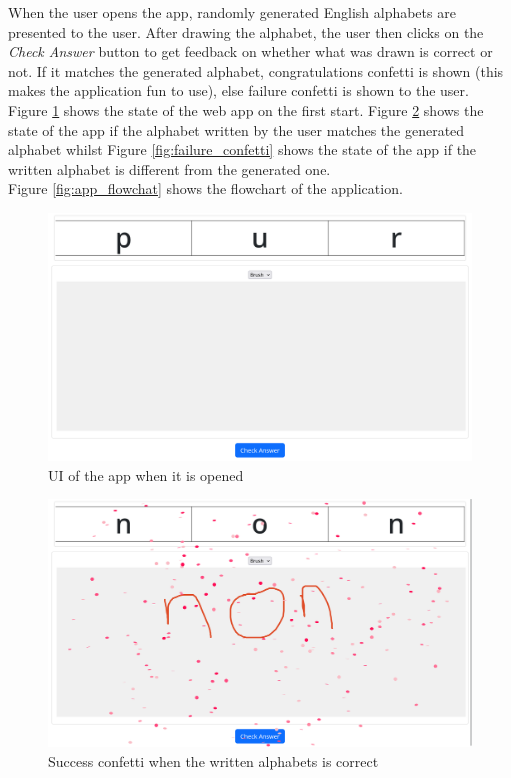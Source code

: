 \documentclass[twocolumn,oneside,12pt,a4paper]{article}
\begin{document}
When the user opens the app, randomly generated English alphabets are presented to the user. After drawing the alphabet, the user then clicks on the \textit{Check Answer} button to get feedback on whether what was drawn is correct or not. If it matches the generated alphabet, congratulations confetti is shown (this makes the application fun to use), else failure confetti is shown to the user. Figure \ref{fig:start_state} shows the state of the web app on the first start. Figure \ref{fig:success_confetti} shows the state of the app if the alphabet written by the user matches the generated alphabet whilst Figure \ref{fig:failure_confetti} shows the state of the app if the written alphabet is different from the generated one. \\
Figure \ref{fig:app_flowchat} shows the flowchart of the application.


\begin{figure}
  \centering
  \includegraphics[width=\linewidth]{../start_state.png}
  \caption{UI of the app when it is opened}
  \label{fig:start_state}
\end{figure}

\begin{figure}
    \centering
    \includegraphics[width=\linewidth]{../success.png}
    \caption{Success confetti when the written alphabets is correct}
    \label{fig:success_confetti}
\end{figure}
\end{document}
